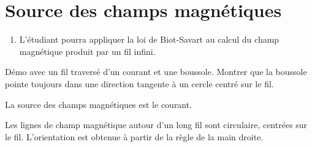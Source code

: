 \section{Source des champs magnétiques}



\begin{enumerate}
  \item L'étudiant pourra appliquer la loi de Biot-Savart au calcul du champ
    magnétique produit par un fil infini.
\end{enumerate}


Démo avec un fil traversé d'un courant et une boussole. Montrer que la boussole
pointe toujours dans une direction tangente à un cercle centré sur le fil.

\begin{fondamentalbox}
  La source des champs magnétiques est le courant.
\end{fondamentalbox}

Les lignes de champ magnétique autour d'un long fil sont circulaire, centrées
sur le fil. L'orientation est obtenue à partir de la règle de la main droite.

